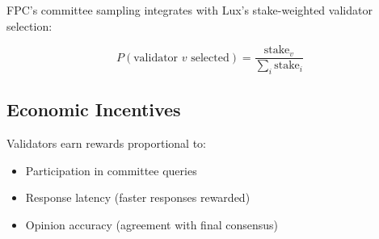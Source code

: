 FPC's committee sampling integrates with Lux's stake-weighted validator selection:

\begin{equation}
P(\text{validator } v \text{ selected}) = \frac{\text{stake}_v}{\sum_{i} \text{stake}_i}
\end{equation}

\subsection{Economic Incentives}

Validators earn rewards proportional to:
\begin{itemize}
\item Participation in committee queries
\item Response latency (faster responses rewarded)
\item Opinion accuracy (agreement with final consensus)
\end{itemize}

